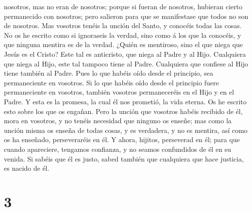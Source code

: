 nosotros, mas no eran de nosotros; porque si fueran de nosotros,
hubieran cierto permanecido con nosotros; pero salieron para que se
manifestase que todos no son de nosotros.  Mas vosotros
tenéis la unción del Santo, y conocéis todas las cosas. 
No os he escrito como si ignoraseis la verdad, sino como á los que la
conocéis, y que ninguna mentira es de la verdad.  ¿Quién
es mentiroso, sino el que niega que Jesús es el Cristo? Este tal es
anticristo, que niega al Padre y al Hijo.  Cualquiera que
niega al Hijo, este tal tampoco tiene al Padre. Cualquiera que confiese
al Hijo tiene también al Padre.  Pues lo que habéis oído
desde el principio, sea permaneciente en vosotros. Si lo que habéis oído
desde el principio fuere permaneciente en vosotros, también vosotros
permaneceréis en el Hijo y en el Padre.  Y esta es la
promesa, la cual él nos prometió, la vida eterna.  Os he
escrito esto sobre los que os engañan.  Pero la unción
que vosotros habéis recibido de él, mora en vosotros, y no tenéis
necesidad que ninguno os enseñe; mas como la unción misma os enseña de
todas cosas, y es verdadera, y no es mentira, así como os ha enseñado,
perseveraréis en él.  Y ahora, hijitos, perseverad en él;
para que cuando apareciere, tengamos confianza, y no seamos confundidos
de él en su venida.  Si sabéis que él es justo, sabed
también que cualquiera que hace justicia, es nacido de él.

\hypertarget{section-2}{%
\section{3}\label{section-2}}

